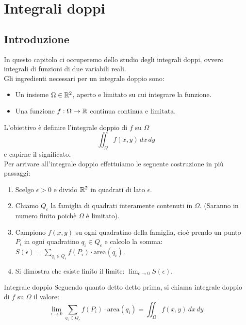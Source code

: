 \chapter{Integrali doppi}

\section{Introduzione}
In questo capitolo ci occuperemo dello studio degli integrali doppi, ovvero integrali di funzioni di due variabili reali.\\

Gli ingredienti necessari per un integrale doppio sono:
\begin{itemize}
\item Un insieme $\Omega \in \mathbb{R}^2$, aperto e limitato su cui integrare la funzione.
\item Una funzione $f:\Omega \rightarrow \mathbb{R}$ continua continua e limitata.
\end{itemize}

L'obiettivo è definire l'integrale doppio di $f$ su $\Omega$
\[
\iint_{\Omega} f(x,y) \, dx \, dy
\]
e capirne il significato.\\

Per arrivare all'integrale doppio effettuiamo le seguente costruzione in più passaggi:
\begin{enumerate}
  \item Scelgo $\epsilon>0$ e divido $\mathbb{R}^2$ in quadrati di lato $\epsilon$.
  \item Chiamo $Q_{\epsilon}$ la famiglia di quadrati interamente contenuti in $\Omega$. (Saranno in numero finito poichè $\Omega$ è limitato).
  \item Campiono $f(x,y)$ su ogni quadratino della famiglia, cioè prendo un punto $P_i$ in ogni quadratino $q_i\in Q_{\epsilon}$ e calcolo la somma: $S(\epsilon)= \sum_{q_i \in Q_{\epsilon}} f(P_i) \cdot \text{area}(q_i)$.
  \item Si dimostra che esiste finito il limite: $\lim_{\epsilon \to 0} S(\epsilon)$.
\end{enumerate}

\begin{definizione}{Integrale doppio}
  Seguendo quanto detto detto prima, si chiama integrale doppio di $f$ su $\Omega$ il valore:
  \[
  \lim_{\epsilon \to 0} \sum_{q_i \in Q_{\epsilon}} f(P_i) \cdot \text{area}(q_i) = \iint_{\Omega} f(x,y) \, dx \, dy
  \]
\end{definizione}


